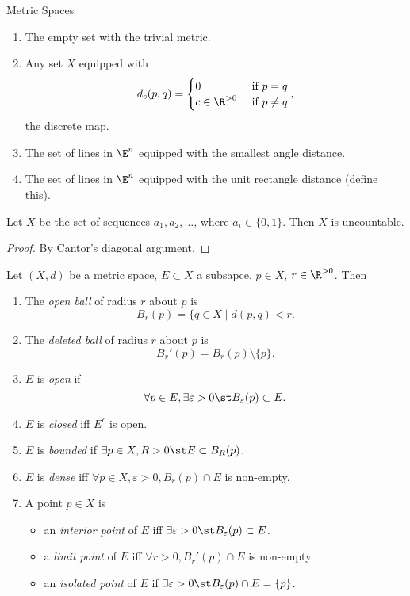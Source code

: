 \documentclass{notes}
\begin{document}
\begin{example}{Metric Spaces}
  \begin{enumerate}
      \item The empty set with the trivial metric.
      \item Any set $X$ equipped with 
        $$d_c(p,q) = \begin{cases} 0 &\text{ if } p=q \\ c\in\R^{>0} &\text{ if } p\neq q
        \end{cases},$$ the discrete map.
      \item The set of lines in $\E^n$ equipped with the smallest angle distance.  
      \item The set of lines in $\E^n$ equipped with the unit rectangle distance (define this).
  \end{enumerate}
\end{example}

\begin{proposition}
  Let $X$ be the set of sequences $a_1, a_2, \ldots$, where $a_i \in \{0,1\}$. Then $X$ is uncountable.
\end{proposition}
\begin{proof}
  By Cantor's diagonal argument.
\end{proof}

\begin{defn}
  Let $(X,d)$ be a metric space, $E\subset X$ a subsapce, $p\in X$, $r\in\R^{>0}$. Then 
  \begin{enumerate}
    \item The \emph{open ball} of radius $r$ about $p$ is $$B_r(p) = \{ q\in X\mid d(p,q) < r.$$
    \item The \emph{deleted ball} of radius $r$ about $p$ is $$B_r'(p) = B_r(p)\setminus\{p\}.$$
    \item $E$ is \emph{open} if $$\forall p\in E, \exists \varepsilon > 0 \st B_\varepsilon(p) \subset E.$$
    \item $E$ is \emph{closed} iff $E^c$ is open.
    \item $E$ is \emph{bounded} if $\exists p\in X, R>0 \st E\subset B_R(p)$.
    \item $E$ is \emph{dense} iff $\forall p\in X, \varepsilon > 0, B_r(p)\cap E$ is non-empty.
    \item A point $p\in X$ is 
      \begin{itemize}
        \item an \emph{interior point} of $E$ iff $\exists \varepsilon > 0 \st B_\varepsilon(p) \subset E$.
        \item a \emph{limit point} of $E$ iff $\forall r > 0, B_r'(p)\cap E$ is non-empty.
        \item an \emph{isolated point} of $E$ if $\exists \varepsilon > 0 \st B_\varepsilon(p)\cap E = \{p\}$.
      \end{itemize}
  \end{enumerate}
\end{defn}
\end{document}
